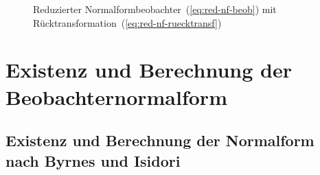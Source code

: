 \begin{figure}
\begin{centering}
\resizebox{0.85\textwidth}{!}{}
\par\end{centering}
\caption{Reduzierter Normalformbeobachter~(\ref{eq:red-nf-beob}) mit Rücktransformation~(\ref{eq:red-nf-ruecktransf})\label{fig:Reduzierter-Normalformbeobachter}}
\end{figure}


\section{Existenz und Berechnung der Beobachternormalform}

\subsection{Existenz und Berechnung der Normalform nach Byrnes und Isidori\label{subsec:Berechnung-nach-Byrnes-Isidori}}

